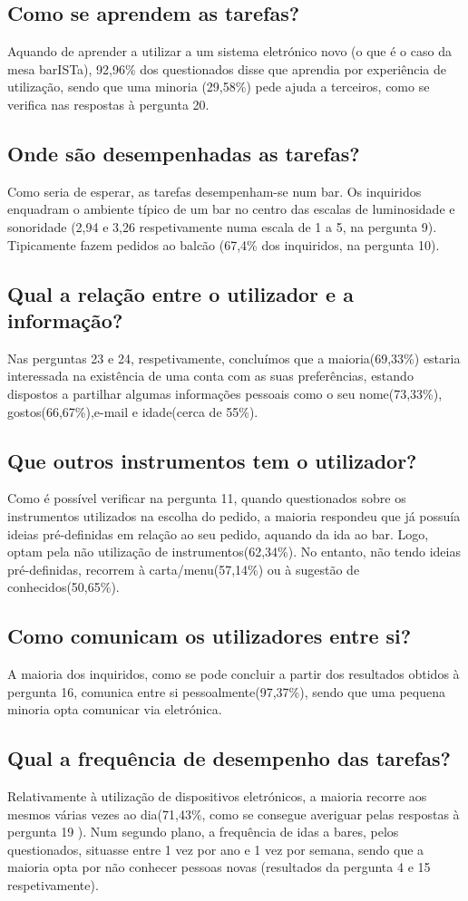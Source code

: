 \documentclass{article}
\begin{document}
\subsection*{Como se aprendem as tarefas?}
Aquando de aprender a utilizar a um sistema eletrónico novo (o que é o caso da mesa barISTa), 92,96\% dos questionados disse que aprendia por experiência de utilização, sendo que uma minoria (29,58\%) pede ajuda a terceiros, como se verifica nas respostas à pergunta 20.
\subsection*{Onde são desempenhadas as tarefas?}
Como seria de esperar, as tarefas desempenham-se num bar. Os inquiridos enquadram o ambiente típico de um bar no centro das escalas de luminosidade e sonoridade (2,94 e 3,26 respetivamente numa escala de 1 a 5, na pergunta 9). Tipicamente fazem pedidos ao balcão (67,4\% dos inquiridos, na pergunta 10).
\subsection*{Qual a relação entre o utilizador e a informação?}
Nas perguntas 23 e 24, respetivamente, concluímos que a maioria(69,33\%) estaria interessada na existência de uma conta com as suas preferências, estando dispostos a partilhar algumas informações pessoais como o seu nome(73,33\%), gostos(66,67\%),e-mail e idade(cerca de 55\%).
\subsection*{Que outros instrumentos tem o utilizador?}
Como é possível verificar na pergunta 11, quando questionados sobre os instrumentos utilizados na escolha do pedido, a maioria respondeu que já possuía ideias pré-definidas em relação ao seu pedido, aquando da ida ao bar. Logo, optam pela não utilização de instrumentos(62,34\%). No entanto, não tendo ideias pré-definidas, recorrem à carta/menu(57,14\%) ou à sugestão de conhecidos(50,65\%).
\subsection*{Como comunicam os utilizadores entre si?}
A maioria dos inquiridos, como se pode concluir a partir dos resultados obtidos à pergunta 16, comunica entre si pessoalmente(97,37\%), sendo que uma pequena minoria opta comunicar via eletrónica.
\subsection*{Qual a frequência de desempenho das tarefas?}
Relativamente à utilização de dispositivos eletrónicos, a maioria recorre aos mesmos várias vezes ao dia(71,43\%, como se consegue averiguar pelas respostas à pergunta 19 ).
Num segundo plano, a frequência de idas a bares, pelos questionados, situasse entre 1 vez por ano e 1 vez por semana, sendo que a maioria opta por não conhecer pessoas novas (resultados da pergunta 4 e 15 respetivamente).
\end{document}
